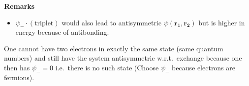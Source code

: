 \newpar{}
\textbf{Remarks}
\begin{itemize}
    \item $\psi_{-}\cdot \left(\text{triplet}\right)$ would also lead to antisymmetric $\psi(\mathbf{r_1},\mathbf{r_2})$ but is higher in energy because of antibonding.
\end{itemize}

\newpar{}

One cannot have two electrons in exactly the same state (same quantum numbers) and still have the system antisymmetric w.r.t.\ exchange because one then has $\psi_{-}=0$ i.e.\ there is no such state (Choose $\psi_{-}$ because electrons are fermions).







